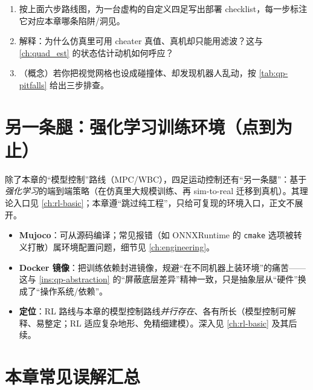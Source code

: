 \begin{practice}[部署演练]
\begin{enumerate}
  \item 按上面六步路线图，为一台虚构的自定义四足写出部署 checklist，每一步标注它对应本章哪条陷阱/洞见。
  \item 解释：为什么仿真里可用 cheater 真值、真机却只能用滤波？这与 \cref{ch:quad_est} 的状态估计动机如何呼应？
  \item （概念）若你把视觉网格也设成碰撞体、却发现机器人乱动，按 \cref{tab:qp-pitfalls} 给出三步排查。
\end{enumerate}
\end{practice}

\section{另一条腿：强化学习训练环境（点到为止）}
\label{sec:qp-rl}

除了本章的“模型控制”路线（MPC/WBC），四足运动控制还有“另一条腿”：基于\emph{强化学习}的端到端策略（在仿真里大规模训练、再 sim-to-real 迁移到真机）。其理论入口见 \cref{ch:rl-basic}；本章遵“跳过纯工程”，只给可复现的环境入口，正文不展开。

\begin{practice}
\begin{itemize}
  \item \textbf{Mujoco}：可从源码编译；常见报错（如 ONNXRuntime 的 \texttt{cmake} 选项被转义打散）属环境配置问题，细节见 \cref{ch:engineering}。
  \item \textbf{Docker 镜像}：把训练依赖封进镜像，规避“在不同机器上装环境”的痛苦——这与 \cref{ins:qp-abstraction} 的“屏蔽底层差异”精神一致，只是抽象层从“硬件”换成了“操作系统/依赖”。
  \item \textbf{定位}：RL 路线与本章的模型控制路线\emph{并行存在}、各有所长（模型控制可解释、易整定；RL 适应复杂地形、免精细建模）。深入见 \cref{ch:rl-basic} 及其后续。
\end{itemize}
\end{practice}

\section*{本章常见误解汇总}

